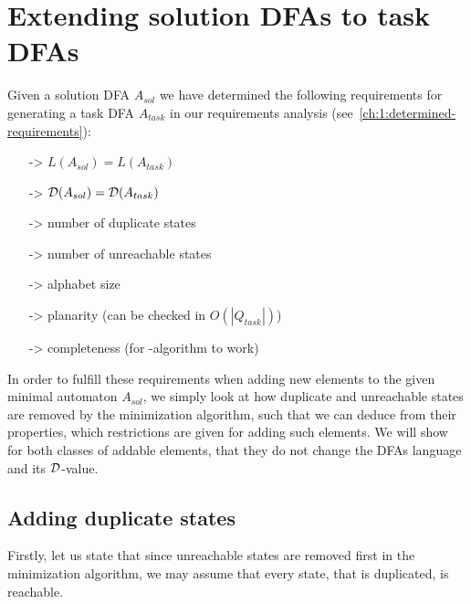 
\chapter{Extending solution DFAs to task DFAs} \label{ch:3}

Given a solution DFA $A_{sol}$ we have determined the following requirements for generating a task DFA $A_{task}$ in our requirements analysis (see~\ref{ch:1:determined-requirements}):
\begin{itemize}
	\item[->] $L(A_{sol}) = L(A_{task})$
	\item[->] $\mathcal{D}(A_{sol}) = \mathcal{D}(A_{task})$
	\item[->] number of duplicate states
	\item[->] number of unreachable states
	\item[->] alphabet size
	\item[->] planarity (can be checked in $O(|Q_{task}|)$)
	\item[->] completeness (for \MinMark-algorithm to work)
\end{itemize}
In order to fulfill these requirements when adding new elements to the given minimal automaton $A_{sol}$, we simply look at how duplicate and unreachable states are removed by the minimization algorithm, such that we can deduce from their properties, which restrictions are given for adding such elements. We will show for both classes of addable elements, that they do not change the DFAs language and its $\mathcal{D}$-value.


\section{Adding duplicate states}

Firstly, let us state that since unreachable states are removed first in the minimization algorithm, we may assume that every state, that is duplicated, is reachable.


